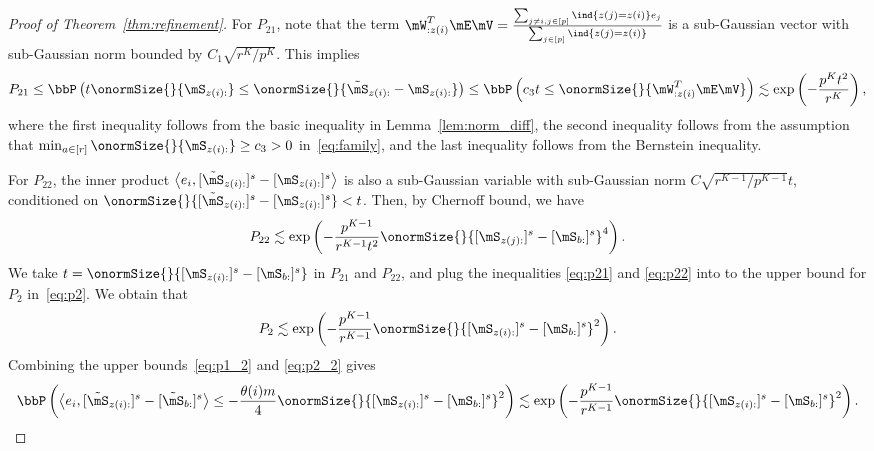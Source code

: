 \documentclass[lettersize,onecolumn,journal]{IEEEtran}
\theoremstyle{definition}
\theoremstyle{definition}
\newcommand{\of}[1]{\left(#1\right)}
\newcommand{\ang}[1]{\left\langle#1\right\rangle}
\begin{document}
\begin{proof}[Proof of Theorem~\ref{thm:refinement}]
    For $P_{21}$, note that the term $\mW^T_{: z(i)} \mE \mV = \frac{ \sum_{ j \neq i, j \in [p]} \ind \{ z(j) = z(i) \} e_j }{\sum_{j \in [p]} \ind \{ z(j) = z(i) \} }$  is a sub-Gaussian vector with sub-Gaussian norm bounded by $C_1 \sqrt{r^K/ p^K}$. This implies
        \begin{align}
        P_{21} \leq \bbP\of{ t \onormSize{}{\mS_{z(i):} } \leq \onormSize{}{ \tilde  \mS_{z(i):}  -  \mS_{z(i):} }  } \leq \bbP\of{c_3 t \leq  \onormSize{}{ \mW^T_{: z(i)} \mE \mV  } } 
        \lesssim \exp\of{ - \frac{p^K t^2}{r^K} }, \label{eq:p21}
    \end{align}
    where the first inequality follows from the basic inequality in Lemma~\ref{lem:norm_diff}, the second inequality follows from the assumption that $ \min_{a \in [r]} \onormSize{}{\mS_{z(i):}} \geq c_3>0$ in~\eqref{eq:family}, and the last inequality follows from the Bernstein inequality.
    
    For $P_{22}$, the inner product $ \ang{e_i, [ \tilde  \mS_{z(i):} ]^s - [ \mS_{z(i):} ]^s}$ is also a sub-Gaussian variable with sub-Gaussian norm $ C \sqrt{ r^{K-1}/ p^{K-1} } t$, conditioned on $\onormSize{}{ [ \tilde  \mS_{z(i):} ]^s - [ \mS_{z(i):} ]^s } < t$. Then, by Chernoff bound, we have 
    \begin{equation}\label{eq:p22}
        P_{22} \lesssim \exp \of{  - \frac{p^{K-1}}{r^{K-1} t^2}   \onormSize{}{ [ \mS_{z(j):}  ]^s - [ \mS_{b:}  ]^s  }^4 }. 
    \end{equation}
    We take $t =  \onormSize{}{ [ \mS_{z(i):}  ]^s - [ \mS_{b:}  ]^s  }$ in $P_{21}$ and $P_{22}$, and plug the inequalities \eqref{eq:p21} and \eqref{eq:p22} into to the upper bound for $P_2$ in~\eqref{eq:p2}. We obtain that 
    \begin{equation}\label{eq:p2_2}
        P_2 \lesssim \exp \of{  - \frac{p^{K-1}}{r^{K-1}}   \onormSize{}{ [ \mS_{z(i):}  ]^s - [ \mS_{b:}  ]^s  }^2 }.
    \end{equation}
    Combining the upper bounds~\eqref{eq:p1_2} and \eqref{eq:p2_2} gives 
       \begin{equation}\label{eq:xi_p}
          \bbP \of{ \ang{ e_i, [  \tilde \mS_{z(i):} ]^s - [  \tilde \mS_{b:} ]^s }  \leq - \frac{\theta(i) m}{4} \onormSize{}{ [ \mS_{z(i):}  ]^s - [ \mS_{b:}  ]^s  }^2} \lesssim  \exp \of{  - \frac{p^{K-1}}{r^{K-1}}   \onormSize{}{ [ \mS_{z(i):}  ]^s - [ \mS_{b:}  ]^s  }^2 }.
    \end{equation}
    

\end{proof}
\end{document}
